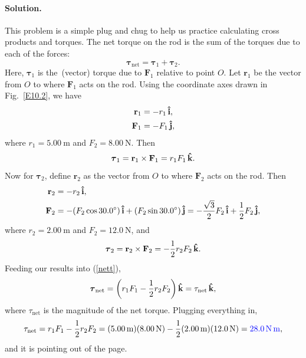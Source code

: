 \documentclass[11pt]{article}
\newcommand{\refeq}[1]{(\ref{#1})}
\newcommand{\beq}{\begin{equation*}}
\newcommand{\eeq}{\end{equation*}}
\newcommand{\beqn}{\begin{equation}}
\newcommand{\eeqn}{\end{equation}}
\newenvironment{solution}
{
    \paragraph{Solution.}
    \ignorespaces
}
{
    \bigskip
}
\renewcommand{\vec}[1]{\mathbf{#1}}
\begin{document}
\newcommand{\vF}{\vec{F}}
\newcommand{\vt}{\boldsymbol{\tau}}
\newcommand{\vr}{\vec{r}}

\newcommand{\vFq}{\vF_1}
\newcommand{\Fq}{F_1}
\newcommand{\vFw}{\vF_2}
\newcommand{\Fw}{F_2}

\newcommand{\vtq}{\vt_1}
\newcommand{\vtw}{\vt_2}
\newcommand{\vrq}{\vr_1}
\newcommand{\rrq}{r_1}
\newcommand{\vrw}{\vr_2}
\newcommand{\rw}{r_2}

\newcommand{\vtnet}{\vt_\text{net}}
\newcommand{\tnet}{\tau_\text{net}}


\begin{solution}
	This problem is a simple plug and chug to help us practice calculating cross products and torques.  The net torque on the rod is the sum of the torques due to each of the forces:
	\beqn \label{nett}
		\vtnet = \vtq + \vtw.
	\eeqn
	Here, $\vtq$ is the~(vector) torque due to $\vFq$ relative to point $O$.  Let $\vrq$ be the vector from $O$ to where $\vFq$ acts on the rod.  Using the coordinate axes drawn in Fig.~\ref{E10.2}, we have
	\begin{align*}
		\vrq &= -\rrq \ih, \\
		\vFq &= -\Fq \jh,
	\end{align*}
	where $\rrq = \SI{5.00}{\meter}$ and $\Fw = \SI{8.00}{\newton}$.  Then
	\beq
		\vtq = \vrq \times \vFq = \rrq \Fq \kh.
	\eeq
	Now for $\vtw$, define $\vrw$ as the vector from $O$ to where $\vFw$ acts on the rod.  Then
		\begin{align*}
		\vrw &= -\rw \ih, \\
		\vFw &= -(\Fw \cos{30.0^\circ}) \ih + (\Fw \sin{30.0^\circ}) \jh = -\frac{\sqrt{3}}{2} \Fw \ih + \frac{1}{2} \Fw \jh,
	\end{align*}
	where $\rw = \SI{2.00}{\meter}$ and $\Fw = \SI{12.0}{\newton}$, and
	\beq
		\vtw = \vrw \times \vFw = -\frac{1}{2} \rw \Fw \kh.
	\eeq
	Feeding our results into \refeq{nett},
	\beq
		\vtnet = \left( \rrq \Fq - \frac{1}{2} \rw \Fw \right)\!\kh = \tnet \kh,
	\eeq
	where $\tnet$ is the magnitude of the net torque.  Plugging everything in,
	\beq
		\tnet = \rrq \Fq - \frac{1}{2} \rw \Fw = (\SI{5.00}{\meter}) (\SI{8.00}{\newton}) - \frac{1}{2} (\SI{2.00}{\meter}) (\SI{12.0}{\newton}) = {\color{blue} \SI{28.0}{\newton\meter}},
	\eeq
	and it is pointing {\color{blue} out of the page}.
\end{solution}

\newcommand{\mb}{m_b}
\newcommand{\mw}{m_w}
\newcommand{\mmp}{m_p}

\newcommand{\simb}{\SI{12.0}{\kg} }
\newcommand{\simw}{\SI{5.00}{\kg} }
\newcommand{\simp}{\SI{2.00}{\kg} }
\newcommand{\sIip}{\SI{0.0625}{\kg\square\meter} }
\end{document}
